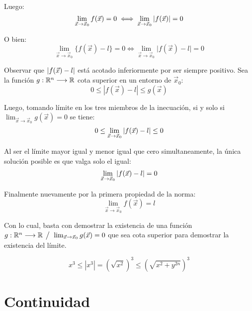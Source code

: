 \documentclass[a5paper,12pt,twoside]{book}
\begin{document}
Luego:
\begin{equation*}
    \lim_{\Vec{x} \to \Vec{x}_0} f(\Vec{x}) = 0 \iff \lim_{\Vec{x} \to \Vec{x}_0} {\left| {f(\Vec{x})} \right|} = 0
\end{equation*}

O bien:
\begin{equation*}
    \lim_{\Vec{x} \to \Vec{x}_0} \Big\{ f(\Vec{x}) - l \Big\} = 0
    \iff
    \lim_{\Vec{x} \to \Vec{x}_0} \Big| f(\Vec{x}) - l \Big| = 0
\end{equation*}

Observar que ${\left| {f(\Vec{x})-l} \right|}$ está acotado inferiormente por ser siempre positivo. Sea la función $g:\mathbb{R}^n \longrightarrow \mathbb{R}$ cota superior en un entorno de $\Vec{x}_0$:
\begin{equation*}
    0 \leq |f(\Vec{x})-l| \leq g(\Vec{x})
\end{equation*}

Luego, tomando límite en los tres miembros de la inecuación, si y solo si $\lim_{\Vec{x} \to \Vec{x}_0} g(\Vec{x})=0$ se tiene:
\begin{equation*}
    0 \leq \lim_{\Vec{x} \to \Vec{x}_0} {\left| {f(\Vec{x})-l} \right|} \leq 0
\end{equation*}

Al ser el límite mayor igual y menor igual que cero simultaneamente, la única solución posible es que valga solo el igual:
\begin{equation*}
    \lim_{\Vec{x} \to \Vec{x}_0} {\left| {f(\Vec{x})-l} \right|} = 0
\end{equation*}

Finalmente nuevamente por la primera propiedad de la norma:
\begin{equation*}
    \lim_{\Vec{x} \to \Vec{x}_0} f(\Vec{x}) = l
\end{equation*}

Con lo cual, basta con demostrar la existencia de una función $g:\mathbb{R}^n \longrightarrow \mathbb{R} \hspace{1ex} \big/ \hspace{1ex} \lim_{\Vec{x} \to \Vec{x}_0} g(\Vec{x})=0$ que sea cota superior para demostrar la existencia del límite.



\begin{equation*}
x^3 \leq |x^3| = \left( \sqrt{x^2} \right)^3 \leq \left( \sqrt{x^2+y^{2n}} \right)^3
\end{equation*}


\section{Continuidad}
\end{document}
